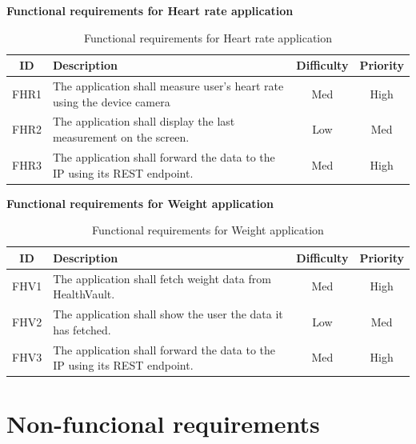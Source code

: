 \textbf{Functional requirements for Heart rate application}

\begin{table}[H]
\begin{center}
\begin{tabular}{ | c | p{9cm} | c | c |}
  \hline
  ID & Description & Difficulty & Priority\\
  \hline\noalign{\smallskip}\noalign{\smallskip}\hline
  FHR1	& The application shall measure user’s heart rate using the device camera    & Med	& High \\
  FHR2	& The application shall display the last measurement on the screen.          & Low	& Med \\
  FHR3	& The application shall forward the data to the IP using its REST endpoint.  & Med	& High \\
  \hline
\end{tabular}
\end{center}
\caption{Functional requirements for Heart rate application}
\label{table:reqheartrate}
\end{table}

\textbf{Functional requirements for Weight application}

\begin{table}[H]
\begin{center}
\begin{tabular}{ | c | p{9cm} | c | c |}
  \hline
  ID & Description & Difficulty & Priority\\
  \hline\noalign{\smallskip}\noalign{\smallskip}\hline
  FHV1	& The application shall fetch weight data from HealthVault.						      & Med	& High \\
  FHV2	& The application shall show the user the data it has fetched.              & Low	& Med \\
  FHV3	& The application shall forward the data to the IP using its REST endpoint. & Med	& High \\
  \hline
\end{tabular}
\end{center}
\caption{Functional requirements for Weight application}
\label{table:reqweight}
\end{table}


\section{Non-funcional requirements}
\label{section:nonfunctionalreq}

